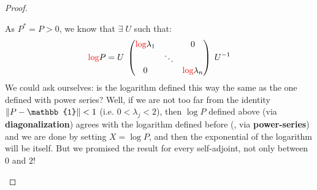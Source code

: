\documentclass[../main.tex]{subfiles}
\begin{document}
\begin{proof}
\begin{enumerate}
    As $P^\ast = P>0$, we know that $\exists\;U$ such that:
    \[
    {\color{red}\log}P=U\;\begin{pmatrix}
    {\color{red}\log}\lambda_1 & & 0\\
     & \ddots & \\
    0 &  &{\color{red}\log}\lambda_n
    \end{pmatrix}\;U^{-1}
    \]
    We could ask ourselves: is the logarithm defined this way the same as the one defined with power series? Well, if we are not too far from the identity $\norm{P-\mathbb{1}}<1$ (i.e. $0<\lambda_j<2$), then $\log P$ defined above (via \textbf{diagonalization}) agrees with the logarithm defined before (, via \textbf{power-series}) and we are done by setting $X=\log P$, and then the exponential of the logarithm will be itself. But we promised the result for every self-adjoint, not only between $0$ and $2$!
    

\end{enumerate}
\end{proof}
\end{document}
